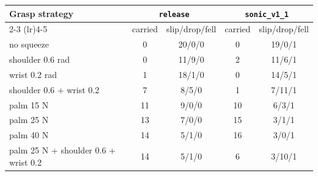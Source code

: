 \begin{tabular}{lcccc}
\toprule
Grasp strategy & \multicolumn{2}{c}{\texttt{release}} & \multicolumn{2}{c}{\texttt{sonic\_v1\_1}} \\
\cmidrule(lr){2-3} \cmidrule(lr){4-5}
 & carried & slip/drop/fell & carried & slip/drop/fell \\
\midrule
no squeeze & 0 & 20/0/0 & 0 & 19/0/1 \\
shoulder 0.6 rad & 0 & 11/9/0 & 2 & 11/6/1 \\
wrist 0.2 rad & 1 & 18/1/0 & 0 & 14/5/1 \\
shoulder 0.6 + wrist 0.2 & 7 & 8/5/0 & 1 & 7/11/1 \\
palm 15 N & 11 & 9/0/0 & 10 & 6/3/1 \\
palm 25 N & 13 & 7/0/0 & 15 & 3/1/1 \\
palm 40 N & 14 & 5/1/0 & 16 & 3/0/1 \\
palm 25 N + shoulder 0.6 + wrist 0.2 & 14 & 5/1/0 & 6 & 3/10/1 \\
\bottomrule
\end{tabular}
